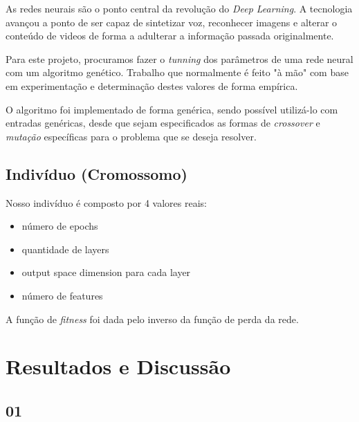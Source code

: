 \documentclass[twoside,conference,a4paper]{IEEEtran}
\begin{document}
As redes neurais são o ponto central da revolução do \emph{Deep Learning}. A tecnologia avançou a ponto de ser capaz de sintetizar voz, reconhecer imagens e alterar o conteúdo de videos de forma a adulterar a informação passada originalmente.

Para este projeto, procuramos fazer o \emph{tunning} dos parâmetros de uma rede neural com um algoritmo genético. Trabalho que normalmente é feito "à mão" com base em experimentação e determinação destes valores de forma empírica.

O algoritmo foi implementado de forma genérica, sendo possível utilizá-lo com entradas genéricas, desde que sejam especificados as formas de \emph{crossover} e \emph{mutação} específicas para o problema que se deseja resolver.

\subsection{Indivíduo (Cromossomo)}

Nosso indivíduo é composto por 4 valores reais:

\begin{itemize}
    \item número de epochs
    \item quantidade de layers
    \item output space dimension para cada layer
    \item número de features
\end{itemize}

A função de \emph{fitness} foi dada pelo inverso da função de perda da rede.

\section{Resultados e Discussão}

\subsection{01}
\end{document}

